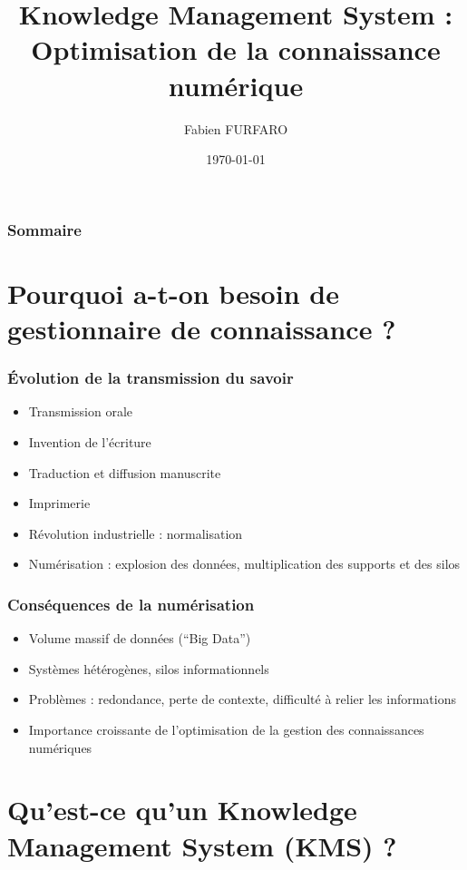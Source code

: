 \documentclass{beamer}
\title{Knowledge Management System :\\Optimisation de la connaissance numérique}
\author{Fabien FURFARO}
\date{\today}
\begin{document}
\frame{\titlepage}

\begin{frame}
  \frametitle{Sommaire}
  \tableofcontents
\end{frame}

\section{Pourquoi a-t-on besoin de gestionnaire de connaissance ?}

\begin{frame}
  \frametitle{Évolution de la transmission du savoir}
  \begin{itemize}
    \item Transmission orale
    \item Invention de l’écriture
    \item Traduction et diffusion manuscrite
    \item Imprimerie
    \item Révolution industrielle : normalisation
    \item Numérisation : explosion des données, multiplication des supports et des silos
  \end{itemize}
\end{frame}

\begin{frame}
  \frametitle{Conséquences de la numérisation}
  \begin{itemize}
    \item Volume massif de données (“Big Data”)
    \item Systèmes hétérogènes, silos informationnels
    \item Problèmes : redondance, perte de contexte, difficulté à relier les informations
    \item Importance croissante de l’optimisation de la gestion des connaissances numériques
  \end{itemize}
\end{frame}

\section{Qu'est-ce qu'un Knowledge Management System (KMS) ?}
\end{document}
